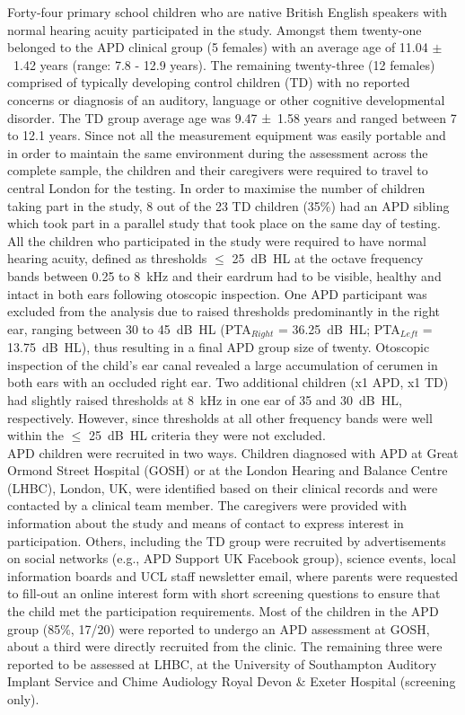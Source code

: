 \documentclass[a4paper, twoside]{templates/ociamthesis}
\begin{document}
Forty-four primary school children who are native British English speakers with normal hearing acuity participated in the study. Amongst them twenty-one belonged to the APD clinical group (5 females) with an average age of 11.04 \(\pm\)~1.42 years (range: 7.8 - 12.9 years). The remaining twenty-three (12 females) comprised of typically developing control children (TD) with no reported concerns or diagnosis of an auditory, language or other cognitive developmental disorder. The TD group average age was 9.47 ±~1.58 years and ranged between 7 to 12.1 years. Since not all the measurement equipment was easily portable and in order to maintain the same environment during the assessment across the complete sample, the children and their caregivers were required to travel to central London for the testing. In order to maximise the number of children taking part in the study, 8 out of the 23 TD children (35\%) had an APD sibling which took part in a parallel study that took place on the same day of testing. All the children who participated in the study were required to have normal hearing acuity, defined as thresholds \(\leq\) 25~dB~HL at the octave frequency bands between 0.25 to 8~kHz and their eardrum had to be visible, healthy and intact in both ears following otoscopic inspection. One APD participant was excluded from the analysis due to raised thresholds predominantly in the right ear, ranging between 30 to 45~dB~HL (PTA\(_{Right}\) = 36.25~dB~HL; PTA\(_{Left}\) = 13.75~dB~HL), thus resulting in a final APD group size of twenty. Otoscopic inspection of the child's ear canal revealed a large accumulation of cerumen in both ears with an occluded right ear. Two additional children (x1 APD, x1 TD) had slightly raised thresholds at 8~kHz in one ear of 35 and 30~dB~HL, respectively. However, since thresholds at all other frequency bands were well within the \(\leq\) 25~dB~HL criteria they were not excluded.\\

APD children were recruited in two ways. Children diagnosed with APD at Great Ormond Street Hospital (GOSH) or at the London Hearing and Balance Centre (LHBC), London, UK, were identified based on their clinical records and were contacted by a clinical team member. The caregivers were provided with information about the study and means of contact to express interest in participation. Others, including the TD group were recruited by advertisements on social networks (e.g., APD Support UK Facebook group), science events, local information boards and UCL staff newsletter email, where parents were requested to fill-out an online interest form with short screening questions to ensure that the child met the participation requirements. Most of the children in the APD group (85\%, 17/20) were reported to undergo an APD assessment at GOSH, about a third were directly recruited from the clinic. The remaining three were reported to be assessed at LHBC, at the University of Southampton Auditory Implant Service and Chime Audiology Royal Devon \& Exeter Hospital (screening only).\\
\end{document}
